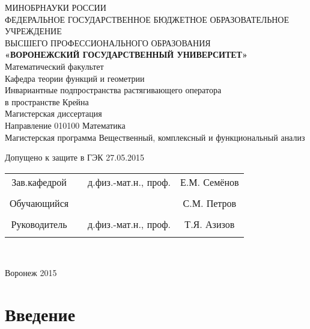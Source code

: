 \documentclass[a4paper]{article}
\begin{document}
 
\begin{center}
\hfill \break
\large{МИНОБРНАУКИ РОССИИ}\\
\footnotesize{ФЕДЕРАЛЬНОЕ ГОСУДАРСТВЕННОЕ БЮДЖЕТНОЕ ОБРАЗОВАТЕЛЬНОЕ УЧРЕЖДЕНИЕ}\\ 
\footnotesize{ВЫСШЕГО ПРОФЕССИОНАЛЬНОГО ОБРАЗОВАНИЯ}\\
\small{\textbf{«ВОРОНЕЖСКИЙ ГОСУДАРСТВЕННЫЙ УНИВЕРСИТЕТ»}}\\
\hfill \break
\normalsize{Математический факультет}\\
 \hfill \break
\normalsize{Кафедра теории функций и  геометрии}\\
\hfill\break
\hfill \break
\hfill \break
\hfill \break
\large{Инвариантные подпространства растягивающего оператора\\ в пространстве Крейна}\\
\hfill \break
\hfill \break
\hfill \break
\normalsize{Магистерская диссертация\\
\hfill \break
Направление  010100 Математика\\
\hfill \break
Магистерская программа    Вещественный, комплексный и функциональный анализ}\\
\hfill \break
\hfill \break
\end{center}
 
\normalsize{ \hspace{28pt} Допущено к защите в ГЭК  27.05.2015} \hfill \break
\hfill \break
 
\normalsize{ 
\begin{tabular}{cccc}
Зав.кафедрой & \underline{\hspace{3cm}} &  д.физ.-мат.н.,  проф. & Е.М. Семёнов \\\\
Обучающийся & \underline{\hspace{3cm}} & &С.М. Петров \\\\
Руководитель & \underline{\hspace{3cm}}& д.физ.-мат.н., проф.&  Т.Я. Азизов \\\\
\end{tabular}
}\\
\hfill \break
\hfill \break
\begin{center} Воронеж 2015 \end{center}
\thispagestyle{empty} %
 
 
\newpage
     
    \tableofcontents %
\newpage
 
\newpage
\section{Введение}
 
 
\end{document}
